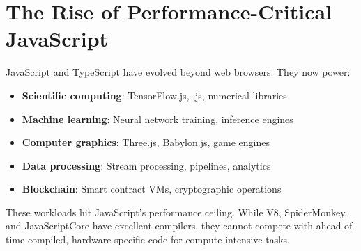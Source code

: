 \section{The Rise of Performance-Critical JavaScript}

JavaScript and TypeScript have evolved beyond web browsers. They now power:

\begin{itemize}[noitemsep]
  \item \textbf{Scientific computing}: TensorFlow.js, .js, numerical libraries
  \item \textbf{Machine learning}: Neural network training, inference engines
  \item \textbf{Computer graphics}: Three.js, Babylon.js, game engines
  \item \textbf{Data processing}: Stream processing,  pipelines, analytics
  \item \textbf{Blockchain}: Smart contract VMs, cryptographic operations
\end{itemize}

These workloads hit JavaScript's performance ceiling. While V8, SpiderMonkey, and JavaScriptCore have excellent  compilers, they cannot compete with ahead-of-time compiled, hardware-specific code for compute-intensive tasks.

